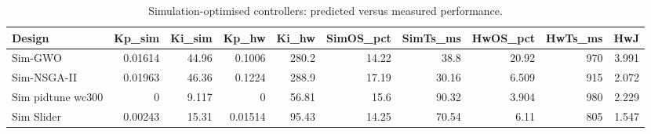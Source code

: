 \begin{table}[t]
\centering\caption{Simulation-optimised controllers: predicted versus measured performance.}\label{tab:simhw}
\begin{tabular}{lrrrrrrrrr}
\toprule
Design & Kp\_sim & Ki\_sim & Kp\_hw & Ki\_hw & SimOS\_pct & SimTs\_ms & HwOS\_pct & HwTs\_ms & HwJ \\
\midrule
Sim-GWO & 0.01614 & 44.96 & 0.1006 & 280.2 & 14.22 & 38.8 & 20.92 & 970 & 3.991 \\
Sim-NSGA-II & 0.01963 & 46.36 & 0.1224 & 288.9 & 17.19 & 30.16 & 6.509 & 915 & 2.072 \\
Sim pidtune wc300 & 0 & 9.117 & 0 & 56.81 & 15.6 & 90.32 & 3.904 & 980 & 2.229 \\
Sim Slider & 0.00243 & 15.31 & 0.01514 & 95.43 & 14.25 & 70.54 & 6.11 & 805 & 1.547 \\
\bottomrule
\end{tabular}
\end{table}
